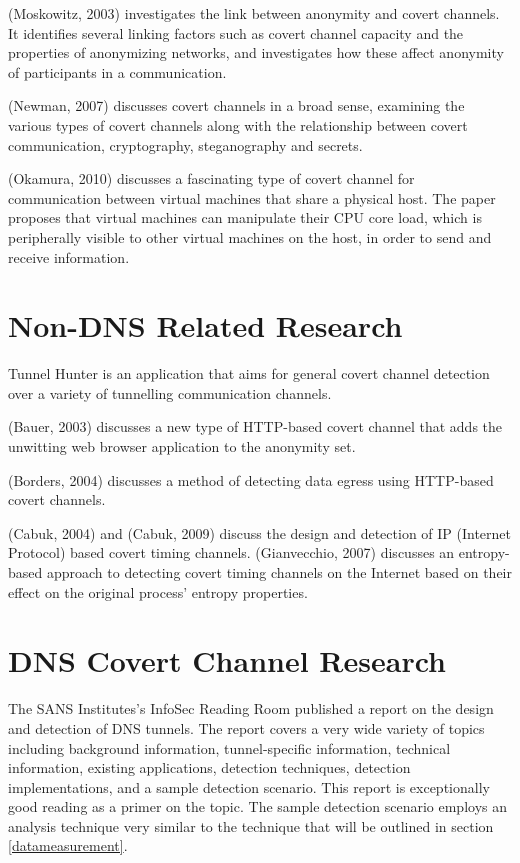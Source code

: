 \documentclass[12pt]{report}
\theoremstyle{remark}
\theoremstyle{definition}
\theoremstyle{definition}
\theoremstyle{definition}
\begin{document}
(Moskowitz, 2003)\cite{Moskowitz2003} investigates the link between anonymity
and covert channels. It identifies several linking factors such as covert
channel capacity and the properties of anonymizing networks, and investigates
how these affect anonymity of participants in a communication.

(Newman, 2007)\cite{Newman2007} discusses covert channels in a broad sense,
examining the various types of covert channels along with the relationship
between covert communication, cryptography, steganography and secrets.

(Okamura, 2010)\cite{Okamura2010} discusses a fascinating type of covert channel
for communication between virtual machines that share a physical host. The paper
proposes that virtual machines can manipulate their CPU core load, which is
peripherally visible to other virtual machines on the host, in order to send and
receive information.

\section{Non-DNS Related Research}
Tunnel Hunter\cite{Dusi2009} is an application that aims for general covert
channel detection over a variety of tunnelling communication channels.

(Bauer, 2003)\cite{Bauer2003} discusses a new type of HTTP-based covert channel
that adds the unwitting web browser application to the anonymity set.

(Borders, 2004)\cite{Borders2004} discusses a method of detecting data egress
using HTTP-based covert channels.

(Cabuk, 2004)\cite{Cabuk2004} and (Cabuk, 2009)\cite{Cabuk2009} discuss the
design and detection of IP (Internet Protocol) based covert timing channels.
(Gianvecchio, 2007)\cite{Gianvecchio2007} discusses an entropy-based approach to
detecting covert timing channels on the Internet based on their effect on the
original process' entropy properties.

\section{DNS Covert Channel Research}
The SANS Institutes's InfoSec Reading Room published a report on the design and
detection of DNS tunnels\cite{SANS2013}. The report covers a very wide variety
of topics including background information, tunnel-specific information,
technical information, existing applications, detection techniques, detection
implementations, and a sample detection scenario. This report is exceptionally
good reading as a primer on the topic. The sample detection scenario employs an
analysis technique very similar to the technique that will be outlined in
section \ref{datameasurement}.
\end{document}
